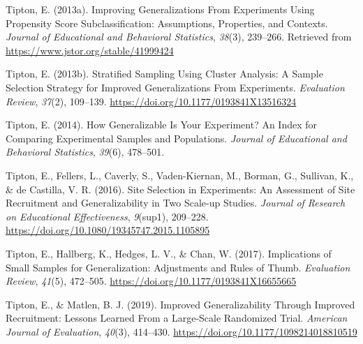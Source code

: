 \documentclass[man,floatsintext]{apa6}
\begin{document}
\leavevmode\hypertarget{ref-tiptonImprovingGeneralizationsExperiments2013}{}%
Tipton, E. (2013a). Improving Generalizations From Experiments Using Propensity Score Subclassification: Assumptions, Properties, and Contexts. \emph{Journal of Educational and Behavioral Statistics}, \emph{38}(3), 239--266. Retrieved from \url{https://www.jstor.org/stable/41999424}

\leavevmode\hypertarget{ref-tiptonStratifiedSamplingUsing2013}{}%
Tipton, E. (2013b). Stratified Sampling Using Cluster Analysis: A Sample Selection Strategy for Improved Generalizations From Experiments. \emph{Evaluation Review}, \emph{37}(2), 109--139. \url{https://doi.org/10.1177/0193841X13516324}

\leavevmode\hypertarget{ref-tiptonHowGeneralizableYour2014}{}%
Tipton, E. (2014). How Generalizable Is Your Experiment? An Index for Comparing Experimental Samples and Populations. \emph{Journal of Educational and Behavioral Statistics}, \emph{39}(6), 478--501.

\leavevmode\hypertarget{ref-tiptonSiteSelectionExperiments2016}{}%
Tipton, E., Fellers, L., Caverly, S., Vaden-Kiernan, M., Borman, G., Sullivan, K., \& de Castilla, V. R. (2016). Site Selection in Experiments: An Assessment of Site Recruitment and Generalizability in Two Scale-up Studies. \emph{Journal of Research on Educational Effectiveness}, \emph{9}(sup1), 209--228. \url{https://doi.org/10.1080/19345747.2015.1105895}

\leavevmode\hypertarget{ref-tiptonImplicationsSmallSamples2017}{}%
Tipton, E., Hallberg, K., Hedges, L. V., \& Chan, W. (2017). Implications of Small Samples for Generalization: Adjustments and Rules of Thumb. \emph{Evaluation Review}, \emph{41}(5), 472--505. \url{https://doi.org/10.1177/0193841X16655665}

\leavevmode\hypertarget{ref-tiptonImprovedGeneralizabilityImproved2019}{}%
Tipton, E., \& Matlen, B. J. (2019). Improved Generalizability Through Improved Recruitment: Lessons Learned From a Large-Scale Randomized Trial. \emph{American Journal of Evaluation}, \emph{40}(3), 414--430. \url{https://doi.org/10.1177/1098214018810519}

\endgroup
\end{document}
